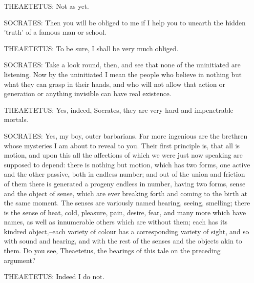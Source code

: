 THEAETETUS: Not as yet.

SOCRATES: Then you will be obliged to me if I help you to unearth the
hidden 'truth' of a famous man or school.

THEAETETUS: To be sure, I shall be very much obliged.

SOCRATES: Take a look round, then, and see that none of the uninitiated
are listening. Now by the uninitiated I mean the people who believe in
nothing but what they can grasp in their hands, and who will not allow
that action or generation or anything invisible can have real existence.

THEAETETUS: Yes, indeed, Socrates, they are very hard and impenetrable
mortals.

SOCRATES: Yes, my boy, outer barbarians. Far more ingenious are the
brethren whose mysteries I am about to reveal to you. Their first
principle is, that all is motion, and upon this all the affections of
which we were just now speaking are supposed to depend: there is nothing
but motion, which has two forms, one active and the other passive, both
in endless number; and out of the union and friction of them there is
generated a progeny endless in number, having two forms, sense and the
object of sense, which are ever breaking forth and coming to the birth
at the same moment. The senses are variously named hearing, seeing,
smelling; there is the sense of heat, cold, pleasure, pain, desire,
fear, and many more which have names, as well as innumerable others
which are without them; each has its kindred object,--each variety
of colour has a corresponding variety of sight, and so with sound and
hearing, and with the rest of the senses and the objects akin to them.
Do you see, Theaetetus, the bearings of this tale on the preceding
argument?

THEAETETUS: Indeed I do not.

